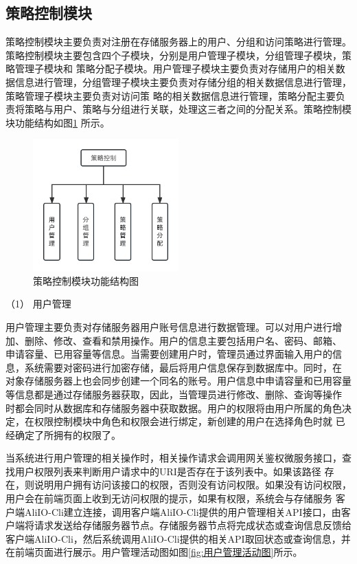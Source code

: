 \subsection{策略控制模块}

策略控制模块主要负责对注册在存储服务器上的用户、分组和访问策略进行管理。策略控制模块主要包含四个子模块，分别是用户管理子模块，分组管理子模块，策略管理子模块和
策略分配子模块。用户管理子模块主要负责对存储用户的相关数据信息进行管理，分组管理子模块主要负责对存储分组的相关数据信息进行管理，策略管理子模块主要负责对访问策
略的相关数据信息进行管理，策略分配主要负责将策略与用户、策略与分组进行关联，处理这三者之间的分配关系。策略控制模块功能结构如图\ref{fig:策略控制模块功能结构图}
所示。

\begin{figure}[htb]
    \centering
    \includegraphics[width=0.5\textwidth]{my_figures/chapter4/策略控制模块功能结构图.png}
    \caption{策略控制模块功能结构图}
    \label{fig:策略控制模块功能结构图}
\end{figure}

（1） 用户管理

用户管理主要负责对存储服务器用户账号信息进行数据管理。可以对用户进行增加、删除、修改、查看和禁用操作。用户的信息主要包括用户名、密码、邮箱、
申请容量、已用容量等信息。当需要创建用户时，管理员通过界面输入用户的信息，系统需要对密码进行加密存储，最后将用户信息保存到数据库中。同时，在
对象存储服务器上也会同步创建一个同名的账号。用户信息中申请容量和已用容量等信息都是通过存储服务器获取，因此，当管理员进行修改、删除、查询等操作
时都会同时从数据库和存储服务器中获取数据。用户的权限将由用户所属的角色决定，在权限控制模块中角色和权限会进行绑定，新创建的用户在选择角色时就
已经确定了所拥有的权限了。

当系统进行用户管理的相关操作时，相关操作请求会调用网关鉴权微服务接口，查找用户权限列表来判断用户请求中的URI是否存在于该列表中。如果该路径
存在，则说明用户拥有访问该接口的权限，否则没有访问权限。如果没有访问权限，用户会在前端页面上收到无访问权限的提示，如果有权限，系统会与存储服务
客户端AliIO-Cli建立连接，调用客户端AliIO-Cli提供的用户管理相关API接口，由客户端将请求发送给存储服务器节点。存储服务器节点将完成状态或查询信息反馈给
客户端AliIO-Cli，然后系统调用AliIO-Cli提供的相关API取回状态或查询信息，并在前端页面进行展示。用户管理活动图如图\ref{fig:用户管理活动图}所示。

